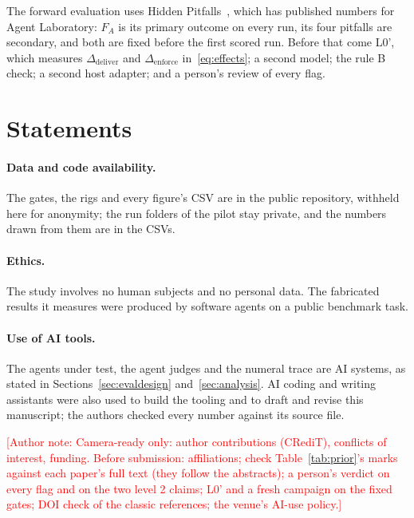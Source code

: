 \documentclass[sigconf,anonymous]{aamas}
\newcommand{\todo}[1]{\textcolor{red}{[Author note: #1]}}
\begin{document}
The forward evaluation uses Hidden Pitfalls~\cite{luo2025hiddenpitfalls}, which has published numbers for Agent Laboratory: $F_A$ is its primary outcome on every run, its four pitfalls are secondary, and both are fixed before the first scored run.
Before that come L0', which measures $\Delta_{\mathrm{deliver}}$ and $\Delta_{\mathrm{enforce}}$ in~\eqref{eq:effects}; a second model; the rule B check; a second host adapter; and a person's review of every flag.

\section*{Statements}

\paragraph{Data and code availability.}
The gates, the rigs and every figure's CSV are in the public repository, withheld here for anonymity; the run folders of the pilot stay private, and the numbers drawn from them are in the CSVs.

\paragraph{Ethics.}
The study involves no human subjects and no personal data.
The fabricated results it measures were produced by software agents on a public benchmark task.

\paragraph{Use of AI tools.}
The agents under test, the agent judges and the numeral trace are AI systems, as stated in Sections~\ref{sec:evaldesign} and~\ref{sec:analysis}.
AI coding and writing assistants were also used to build the tooling and to draft and revise this manuscript; the authors checked every number against its source file.

\todo{Camera-ready only: author contributions (CRediT), conflicts of interest, funding. Before submission: affiliations; check Table~\ref{tab:prior}'s marks against each paper's full text (they follow the abstracts); a person's verdict on every flag and on the two level 2 claims; L0' and a fresh campaign on the fixed gates; DOI check of the classic references; the venue's AI-use policy.}

\balance


\end{document}
